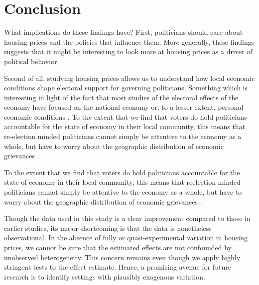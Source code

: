 \documentclass[12pt,a4paper]{article}
\begin{document}
\section{Conclusion}

What implications do these findings have? First,  politicians should care about housing prices and the policies that influence them.  More generally, these findings suggests that it might be interesting to look more at housing prices as a driver of political behavior.
 
 Second of all, studying housing prices allows us to understand how local economic conditions shape electoral support for governing politicians. Something which is interesting in light of the fact that most studies of the electoral effects of the economy have focused on the national economy or, to a lesser extent, personal economic conditions \citep[290]{healy2013retrospective}. To the extent that we find that voters do hold politicians accountable for the state of economy in their local community, this means that re-election minded politicians cannot simply be attentive to the economy as a whole, but have to worry about the geographic distribution of economic grievances \citep[cf.][11]{ferejohn1986incumbent}. 

 To the extent that we find that voters do hold politicians accountable for the state of economy in their local community, this means that reelection minded politicians cannot simply be attentive to the economy as a whole, but have to worry about the geographic distribution of economic grievances \citep[cf.][11]{ferejohn1986incumbent}. 

Though the data used in this study is a clear improvement compared to those in earlier studies, its major shortcoming is that the data is nonetheless observational. In the absence of fully or quasi-experimental variation in housing prices, we cannot be sure that the estimated effects are not confounded by unobserved heterogeneity. This concern remains even though we apply highly stringent tests to the effect estimate. Hence, a promising avenue for future research is to identify settings with plausibly exogenous variation. 


\end{document}
